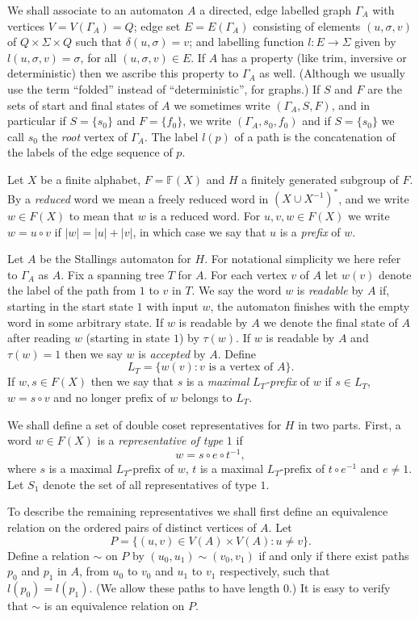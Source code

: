 \documentclass[a4paper,12pt]{article}
\newcommand{\G}{\Gamma }
\renewcommand{\d}{\delta }
\newcommand{\s}{\sigma }
\renewcommand{\S}{\Sigma }
\renewcommand{\t}{\tau }
\numberwithin{equation}{section}
\numberwithin{figure}{section}
\newcommand{\FF}{\ensuremath{\mathbb{F}}}
\newcommand{\maps}{\rightarrow}
\begin{document}
We shall associate to an automaton $A$ a directed, edge labelled graph
$\G_A$ with vertices $V=V(\G_A)=Q$;  
edge set $E=E(\G_A)$ consisting
of elements $(u,\s,v)$ of $Q\times \S\times Q$ such that $\d(u,\s)=v$; and 
labelling function $l:E\maps \S$ given by $l(u,\s,v)=\s$, for all $(u,\s,v)
\in E$.  If $A$ has a property (like trim, inversive or deterministic) then
we ascribe this property to $\G_A$ as well. (Although we usually use the term
``folded'' instead of ``deterministic'', for graphs.) If $S$ and $F$ are the
sets of
 start and final states of $A$ we sometimes write $(\G_A, S,F)$, and
in particular if $S=\{s_0\}$ and $F=\{f_0\}$, we write $(\G_A,s_0,f_0)$ and 
if $S=\{s_0\}$ we  
call $s_0$ the {\em root} vertex of $\G_A$. The label $l(p)$ of a path
is the concatenation of the labels of the edge sequence of $p$. 


Let $X$ be a finite alphabet, $F=\FF(X)$ and $H$ a finitely generated subgroup
of $F$.  By a {\em reduced} word we mean 
 a freely reduced word in $(X\cup X^{-1})^\ast$, and we write $w\in F(X)$
to mean that $w$ is a reduced word. For $u,v, w\in F(X)$ we 
write $w=u\circ v$ if $|w|=|u|+|v|$, in which case we say that $u$ is a {\em prefix}
of $w$. 

Let $A$ be the Stallings automaton for $H$. For notational simplicity
we here refer to $\G_A$ as $A$. 
Fix a spanning tree $T$ for $A$. For 
each vertex $v$ of $A$ let $w(v)$ denote the label of the path from $1$ to $v$ in
$T$. We say the word $w$ is {\em readable} by $A$ if, starting in the 
start state $1$ with input $w$, the automaton finishes with the empty
word in some arbitrary state. If $w$ is readable by $A$ we denote the final
state of $A$ after reading $w$ (starting in state $1$) by $\t(w)$. 
If $w$ is readable by $A$ and $\t(w)=1$
 then we say $w$ is {\em accepted} by $A$. Define 
\[L_T=\{w(v): v \textrm{ is a vertex of } A\}.\]  
If $w, s\in F(X)$ then we say that $s$ is a {\em maximal} $L_T${\em -prefix} of $w$ if 
$s\in L_T$, $w=s\circ v$ and no longer prefix of $w$ belongs to $L_T$. 

We shall define a set of double coset representatives for $H$ in two parts. 
First, a word $w\in F(X)$ is a {\em representative of type} $1$ if 
\[w=s\circ e \circ t^{-1},\]
where $s$ is a maximal $L_T$-prefix of $w$, $t$ is a maximal $L_T$-prefix of 
$t\circ e^{-1}$ and $e\neq 1$. Let $S_1$ denote the set of all representatives of 
type $1$. 

To describe the remaining representatives we shall first define an equivalence
relation on the ordered pairs of distinct vertices of $A$. Let
\[P=\{(u,v)\in V(A)\times V(A): u\neq v\}.\]
Define a relation $\sim$ on $P$ by $(u_0,u_1)\sim (v_0,v_1)$ if and only if 
there exist paths $p_0$ and $p_1$ in $A$, from $u_0$ to $v_0$ and $u_1$ to $v_1$ 
respectively, such that $l(p_0)=l(p_1)$. (We allow these paths to have length $0$.)
It is easy to verify that $\sim$ is an equivalence relation on $P$. 
\end{document}
